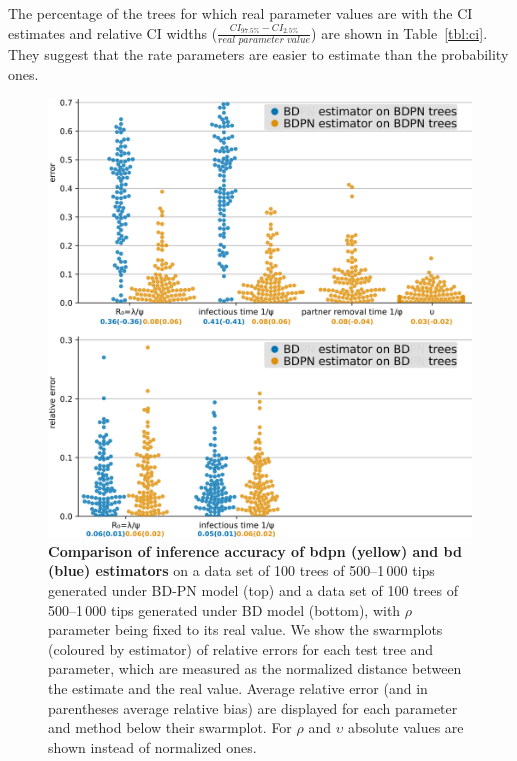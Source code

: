 \documentclass[10pt,letterpaper]{article}
\begin{document}

The percentage of the trees for which real parameter values are with the CI estimates and relative CI widths ($\frac{CI_{97.5\%} - CI_{2.5\%}}{\textit{real parameter value}}$) are shown in Table~\ref{tbl:ci}. They suggest that the rate parameters are easier to estimate than the probability ones.

\begin{figure}[h!]
\centering 
\includegraphics[width=1\textwidth]{Fig_errors_p.png}
\caption{\textbf{Comparison of inference accuracy of bdpn (yellow) and bd (blue) estimators} on a data set of 100 trees of 500--1\,000 tips generated under BD-PN model (top) and a data set of 100 trees of 500--1\,000 tips generated under BD model (bottom), with $\rho$ parameter being fixed to its real value.
We show the swarmplots (coloured by estimator) of relative errors for each test tree and parameter, which are measured as the normalized distance between the estimate and the real value. Average relative error (and in parentheses average relative bias) are displayed for each parameter and method below their swarmplot. For $\rho$ and $\upsilon$ absolute values are shown instead of normalized ones. } 
\label{fig:sim} 
\end{figure}
 
\end{document}
